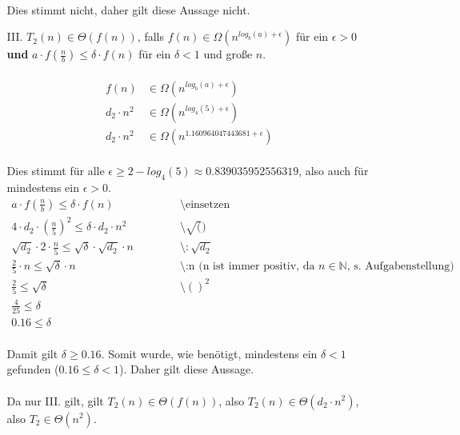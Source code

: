 \documentclass{article}
\begin{document}
\begin{enumerate}
\begin{enumerate}
\[   	    \]
   	    \\
   	    Dies stimmt nicht, daher gilt diese Aussage nicht.
   	    \item[III.]
   	    $T_2(n) \in \Theta (f(n))$, falls $f(n) \in \Omega (n^{log_b(a)+ \epsilon})$ für ein $\epsilon > 0$ \textbf{und} $a \cdot f(\frac{n}{b}) \leq \delta \cdot f(n)$ für ein $\delta < 1$ und große $n$.\\
   	    \\
   	    \[
   	        \begin{array}{ll}
   	            f(n) &\in \Omega (n^{log_b(a)+ \epsilon})\\
   	            d_2\cdot n^2 &\in \Omega (n^{log_4(5)+ \epsilon})\\
   	            d_2\cdot n^2 &\in \Omega (n^{1.160964047443681+ \epsilon})
   	        \end{array}
   	    \]
   	    \\
   	    Dies stimmt für alle $\epsilon \geq 2-log_4(5) \approx 0.839035952556319$, also auch für mindestens ein $\epsilon > 0$.
   	    \[
   	        \begin{array}{lll}
   	            a \cdot f(\frac{n}{b}) \leq \delta \cdot f(n)~~~~~~~~~~~~~~~~~~~~~~~&\text{\textbackslash einsetzen}\\
   	            4 \cdot d_2\cdot (\frac{n}{5})^2 \leq \delta \cdot d_2\cdot n^2 &\text{\textbackslash $\sqrt()$}\\
   	            \sqrt{d_2}\cdot 2 \cdot \frac{n}{5} \leq \sqrt{\delta}\cdot \sqrt{d_2} \cdot n & \text{\textbackslash $:\sqrt{d_2}$}\\
   	            \frac{2}{5}\cdot n \leq \sqrt{\delta} \cdot n &\text{\textbackslash :n    (n ist immer positiv, da $n \in \mathbb{N}$, s. Aufgabenstellung)}\\
   	            \frac{2}{5} \leq \sqrt{\delta} &\text{\textbackslash $()^2$}\\
   	            \frac{4}{25} \leq \delta\\
   	            0.16 \leq \delta
   	        \end{array}
   	    \]
   	    \\
   	    Damit gilt $\delta \geq 0.16$. Somit wurde, wie benötigt, mindestens ein $\delta < 1$ gefunden ($0.16 \leq \delta < 1$). Daher gilt diese Aussage.
   	    \\\\
   	    Da nur III. gilt, gilt $T_2(n) \in \Theta (f(n))$, also $T_2(n) \in \Theta (d_2\cdot n^2)$, also $T_2 \in \Theta (n^2)$.
   	\end{enumerate}
   	

\end{enumerate}
\end{document}
